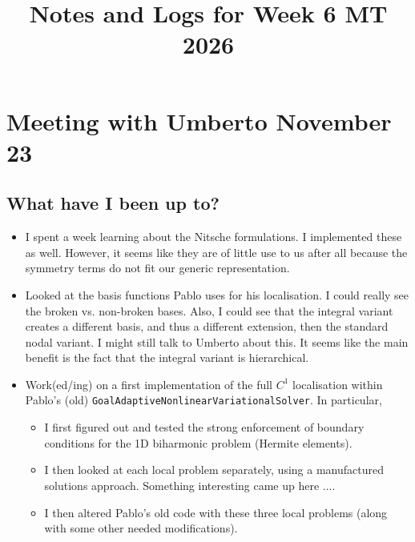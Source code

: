 \documentclass[12pt,a4paper]{article}
\title{\textbf{Notes and Logs for Week 6 MT 2026}}
\author{}
\date{}
\begin{document}
\maketitle

\section{Meeting with Umberto November 23}

\subsection{What have I been up to?}

\begin{itemize}
    \item I spent a week learning about the Nitsche formulations. I implemented these as well. However, it seems like they are of little use to us after all because the symmetry terms do not fit our generic representation. 
    \item Looked at the basis functions Pablo uses for his localisation. I could really see the broken vs. non-broken bases. Also, I could see that the integral variant creates a different basis, and thus a different extension, then the standard nodal variant. I might still talk to Umberto about this. It seems like the main benefit is the fact that the integral variant is hierarchical. 
    \item Work(ed/ing) on a first implementation of the full $C^1$ localisation within Pablo's (old) \texttt{GoalAdaptiveNonlinearVariationalSolver}. In particular, 
    \begin{itemize}
        \item I first figured out and tested the strong enforcement of boundary conditions for the 1D biharmonic problem (Hermite elements).
        \item I then looked at each local problem separately, using a manufactured solutions approach. Something interesting came up here .... 
        \item I then altered Pablo's old code with these three local problems (along with some other needed modifications). 

\end{itemize}
\end{itemize}
\end{document}
